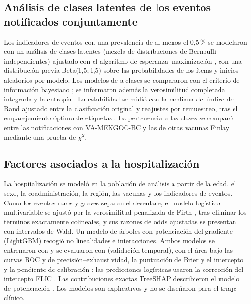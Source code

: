 \documentclass[11pt]{article}
\begin{document}
\subsection{Análisis de clases latentes de los eventos notificados conjuntamente}\label{sec:m-lca}
Los indicadores de eventos con una prevalencia de al menos el 0,5\,\% se modelaron con un análisis
de clases latentes (mezcla de distribuciones de Bernoulli independientes) ajustado con el algoritmo
de esperanza--maximización \cite{Dempster1977}, con una distribución previa Beta(1,5;\,1,5) sobre las
probabilidades de los ítems y \POLCAStarts{} inicios aleatorios por modelo. Los modelos de
\POLCAKMin{} a \POLCAKMax{} clases se compararon con el criterio de información bayesiano
\cite{Schwarz1978}; se informaron además la verosimilitud completada integrada \cite{Biernacki2000}
y la entropía \cite{Nylund2007}. La estabilidad se midió con la mediana del índice de Rand ajustado
\cite{Hubert1985} entre la clasificación original y \POLCABootstrap{} reajustes por remuestreo, tras
el emparejamiento óptimo de etiquetas \cite{Kuhn1955}. La pertenencia a las clases se comparó entre
las notificaciones con VA-MENGOC-BC y las de otras vacunas Finlay mediante una prueba de $\chi^2$.

\subsection{Factores asociados a la hospitalización}\label{sec:m-hosp}
La hospitalización se modeló en la población de análisis a partir de la edad, el sexo, la
coadministración, la región, las vacunas y los indicadores de eventos. Como los eventos raros y graves separan el desenlace, el modelo
logístico multivariable se ajustó por la verosimilitud penalizada de Firth \cite{Firth1993,Heinze2002},
tras eliminar los términos exactamente colineales, y sus razones de odds ajustadas se presentan con
intervalos de Wald. Un modelo de árboles con potenciación del gradiente (LightGBM) \cite{Ke2017}
recogió no linealidades e interacciones. Ambos modelos se entrenaron con \POTrainYears{} y se
evaluaron con \POTestYears{} (validación temporal), con el área bajo las curvas ROC y de
precisión--exhaustividad, la puntuación de Brier y el intercepto y la pendiente de calibración
\cite{VanCalster2019,Collins2024}; las predicciones logísticas usaron la corrección del intercepto
FLIC \cite{Puhr2017}. Las contribuciones exactas TreeSHAP describieron el modelo de potenciación
\cite{Lundberg2020}. Los modelos son explicativos y no se diseñaron para el triaje clínico.
\end{document}
